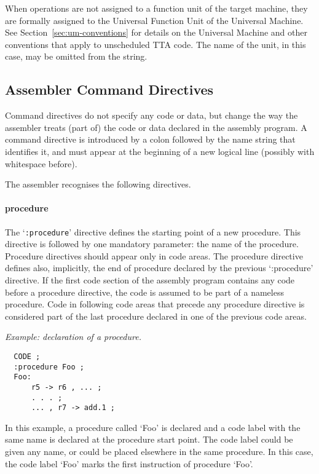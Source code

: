 \documentclass[twoside]{tceusermanual}
\begin{document}
When operations are not assigned to a function unit of the target machine,
they are formally assigned to the Universal Function Unit of the Universal
Machine. See Section~\ref{sec:um-conventions} for details on the Universal
Machine and other conventions that apply to unscheduled TTA code. The name
of the unit, in this case, may be omitted from the string.
%

\subsection{Assembler Command Directives}
\label{ssec:directives}

Command directives do not specify any code or data, but change the way the
assembler treats (part of) the code or data declared in the assembly
program.
%
A command directive is introduced by a colon followed by the name string
that identifies it, and must appear at the beginning of a new logical line
(possibly with whitespace before).

The assembler recognises the following directives.

\paragraph{procedure}
The `\verb|:procedure|' directive defines the starting point of a new
procedure. This directive is followed by one mandatory parameter: the name
of the procedure. Procedure directives should appear only in code areas. The
procedure directive defines also, implicitly, the end of procedure declared
by the previous `:procedure' directive. If the first code section of the
assembly program contains any code before a procedure directive, the code
is assumed to be part of a nameless procedure. Code in following code areas
that precede any procedure directive is considered part of the last
procedure declared in one of the previous code areas.

\emph{Example: declaration of a procedure.}
\begin{verbatim}
  CODE ;
  :procedure Foo ;
  Foo:
      r5 -> r6 , ... ;
      . . . ;
      ... , r7 -> add.1 ;
\end{verbatim}
%
In this example, a procedure called `Foo' is declared and a code label with
the same name is declared at the procedure start point. The code label could
be given any name, or could be placed elsewhere in the same procedure. In
this case, the code label `Foo' marks the first instruction of procedure
`Foo'.
\end{document}
